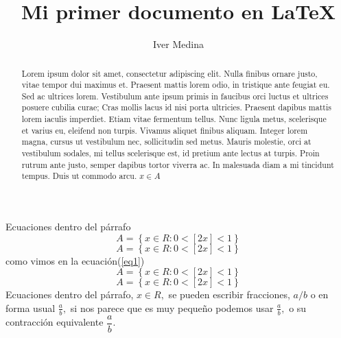 \documentclass{article}								%
\title{Mi primer documento en \LaTeX}				%
\author{Iver Medina}								%
\begin{document}
\maketitle											%
\begin{abstract}									%
Lorem ipsum dolor sit amet, consectetur adipiscing elit. Nulla finibus ornare justo, vitae tempor dui maximus et. Praesent mattis lorem odio, in tristique ante feugiat eu. Sed ac ultrices lorem. Vestibulum ante ipsum primis in faucibus orci luctus et ultrices posuere cubilia curae; Cras mollis lacus id nisi porta ultricies. Praesent dapibus mattis lorem iaculis imperdiet. Etiam vitae fermentum tellus. Nunc ligula metus, scelerisque et varius eu, eleifend non turpis. Vivamus aliquet finibus aliquam. Integer lorem magna, cursus ut vestibulum nec, sollicitudin sed metus. Mauris molestie, orci at vestibulum sodales, mi tellus scelerisque est, id pretium ante lectus at turpis. Proin rutrum ante justo, semper dapibus tortor viverra ac. In malesuada diam a mi tincidunt tempus. Duis ut commodo arcu.
$x \in A$ 
\end{abstract}
Ecuaciones dentro del párrafo
\[
A=\left\lbrace x \in R:0<[2x]<1 \right\rbrace
\]
\begin{equation}\label{eq1}
A=\left\lbrace x \in R:0<[2x]<1 \right\rbrace
\end{equation}
como vimos en la ecuación(\ref{eq1})
\begin{equation*}
A=\left\lbrace x \in R:0<[2x]<1 \right\rbrace
\end{equation*}
$$ A=\left\lbrace x \in R:0<[2x]<1 \right\rbrace $$
Ecuaciones dentro del párrafo, $x\in R,$ se pueden escribir fracciones, $a/b$ o en forma usual $\frac{a}{b},$ si nos parece que es muy pequeño podemos usar $\displaystyle\frac{a}{b},$ o su contracción equivalente $\dfrac{a}{b}.$
\end{document}
